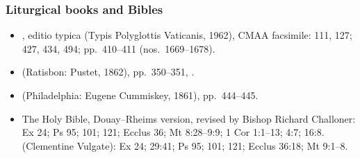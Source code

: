 {\scriptsize
\subsubsection*{Liturgical books and Bibles}
\begin{itemize}\setlength{\itemsep}{0.15em}\setlength{\parskip}{0pt}
\item {}, editio typica (Typis Polyglottis Vaticanis, 1962), CMAA facsimile:  111, 127;  427, 434, 494; pp.~410--411 (nos.~1669--1678).
\item {} (Ratisbon: Pustet, 1862), pp.~350--351, .
\item {} (Philadelphia: Eugene Cummiskey, 1861), pp.~444--445.
\item The Holy Bible, Douay--Rheims version, revised by Bishop Richard Challoner: Ex 24; Ps 95; 101; 121; Ecclus 36; Mt 8:28--9:9; 1 Cor 1:1--13; 4:7; 16:8.  (Clementine Vulgate): Ex 24; 29:41; Ps 95; 101; 121; Ecclus 36:18; Mt 9:1--8.
\end{itemize}

}
